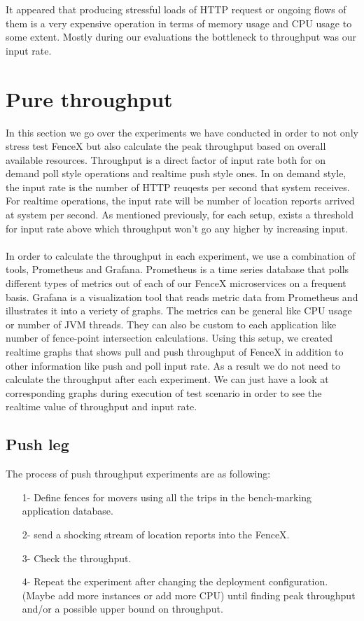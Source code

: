 \documentclass[a4]{report}
\begin{document}
    It appeared that producing stressful loads of HTTP request or ongoing flows of them is a very expensive operation
    in terms of memory usage and CPU usage to some extent.
    Mostly during our evaluations the bottleneck to throughput was our input rate.


    \section{Pure throughput}
    In this section we go over the experiments we have conducted in order to not only stress test FenceX but also
    calculate the peak throughput based on overall available resources.
    Throughput is a direct factor of input rate both for on demand poll style operations and realtime push style ones.
    In on demand style, the input rate is the number of HTTP reuqests per second that system receives.
    For realtime operations, the input rate will be number of location reports arrived at system per second.
    As mentioned previously, for each setup, exists a threshold for input rate above which throughput won't go any
    higher by increasing input.

    \paragraph{}
    In order to calculate the throughput in each experiment, we use a combination of tools, Prometheus and Grafana.
    Prometheus is a time series database that polls different types of metrics out of each of our FenceX
    microservices on a frequent basis.
    Grafana is a visualization tool that reads metric data from Prometheus and illustrates it into a veriety of graphs.
    The metrics can be general like CPU usage or number of JVM threads.
    They can also be custom to each application like number of fence-point intersection calculations.
    Using this setup, we created realtime graphs that shows pull and push throughput of FenceX in addition to other
    information like push and poll input rate.
    As a result we do not need to calculate the throughput after each experiment.
    We can just have a look at corresponding graphs during execution of test scenario in order to see the realtime
    value of throughput and input rate.

    \subsection{Push leg}
    The process of push throughput experiments are as following:
    \begin{itemize}
        \item[1-] Define fences for movers using all the trips in the bench-marking application database.
        \item[2-] send a shocking stream of location reports into the FenceX.
        \item[3-] Check the throughput.
        \item[4-] Repeat the experiment after changing the deployment configuration. (Maybe add more instances or add
        more CPU) until finding peak throughput and/or a possible upper bound on throughput.
    \end{itemize}
\end{document}
